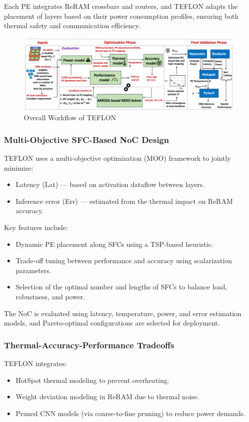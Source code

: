 \documentclass[acmsmall]{acmart}
\begin{document}
Each PE integrates ReRAM crossbars and routers, and TEFLON adapts the placement of layers based on their power consumption profiles, ensuring both thermal safety and communication efficiency.

\begin{figure}[h]
    \centering
    \includegraphics[width=0.8\linewidth]{figures/teflon.png}
    \caption{Overall Workflow of TEFLON \cite{teflon}}
    \label{fig:enter-label}
\end{figure}

\subsubsection{Multi-Objective SFC-Based NoC Design}
TEFLON uses a multi-objective optimization (MOO) framework to jointly minimize:
\begin{itemize}
    \item Latency (Lat) — based on activation dataflow between layers.
    \item Inference error (Err) — estimated from the thermal impact on ReRAM accuracy.
\end{itemize}

Key features include:
\begin{itemize}
    \item Dynamic PE placement along SFCs using a TSP-based heuristic.
    \item Trade-off tuning between performance and accuracy using scalarization parameters.
    \item Selection of the optimal number and lengths of SFCs to balance load, robustness, and power.
\end{itemize}

The NoC is evaluated using latency, temperature, power, and error estimation models, and Pareto-optimal configurations are selected for deployment.

\subsubsection{Thermal-Accuracy-Performance Tradeoffs}
TEFLON integrates:
\begin{itemize}
    \item HotSpot thermal modeling to prevent overheating.
    \item Weight deviation modeling in ReRAM due to thermal noise.
    \item Pruned CNN models (via coarse-to-fine pruning) to reduce power demands.
\end{itemize}
\end{document}
